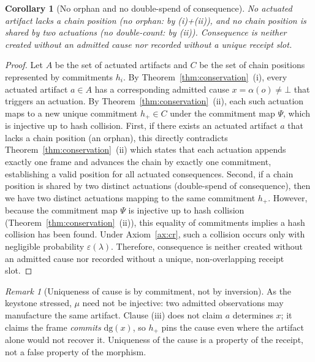 \documentclass[11pt,oneside]{book}
\theoremstyle{definition}
\theoremstyle{plain}
\newtheorem{corollary}[theorem]{Corollary}
\theoremstyle{remark}
\newtheorem*{remark}{Remark}
\newcommand{\muop}{\mu}                        %
\newcommand{\adm}{\alpha}                      %
\newcommand{\Rfsl}{\bot}                        %
\newcommand{\dg}{\mathrm{dg}}                   %
\begin{document}
\begin{corollary}[No orphan and no double-spend of consequence]\label{cor:orphan}
No actuated artifact lacks a chain position (\emph{no orphan}: by (i)+(ii)), and no chain position is shared by two actuations (\emph{no double-count}: by (ii)). %
Consequence is neither created without an admitted cause nor recorded without a unique receipt slot. %
\end{corollary}
\begin{proof}
Let $A$ be the set of actuated artifacts and $C$ be the set of chain positions represented by commitments $h_i$. %
By Theorem~\ref{thm:conservation}~(i), every actuated artifact $a \in A$ has a corresponding admitted cause $x = \adm(o) \neq \Rfsl$ that triggers an actuation. %
By Theorem~\ref{thm:conservation}~(ii), each such actuation maps to a new unique commitment $h_+ \in C$ under the commitment map $\Psi$, which is injective up to hash collision. %
First, if there exists an actuated artifact $a$ that lacks a chain position (an orphan), this directly contradicts Theorem~\ref{thm:conservation}~(ii) which states that each actuation appends exactly one frame and advances the chain by exactly one commitment, establishing a valid position for all actuated consequences. %
Second, if a chain position is shared by two distinct actuations (double-spend of consequence), then we have two distinct actuations mapping to the same commitment $h_+$. %
However, because the commitment map $\Psi$ is injective up to hash collision (Theorem~\ref{thm:conservation}~(ii)), this equality of commitments implies a hash collision has been found. %
Under Axiom~\ref{ax:cr}, such a collision occurs only with negligible probability $\varepsilon(\lambda)$. %
Therefore, consequence is neither created without an admitted cause nor recorded without a unique, non-overlapping receipt slot. %
\end{proof}

\begin{remark}[Uniqueness of cause is by commitment, not by inversion]
As the keystone stressed, $\muop$ need not be injective: two admitted observations may manufacture the same artifact. %
Clause (iii) does not claim $a$ determines $x$; it claims the frame \emph{commits} $\dg(x)$, so $h_{+}$ pins the cause even where the artifact alone would not recover it. %
Uniqueness of the cause is a property of the receipt, not a false property of the morphism. %
\end{remark}
\end{document}
